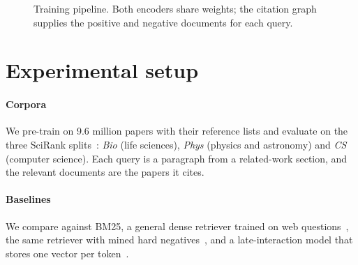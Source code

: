 \documentclass[10pt, twoside]{article}
\begin{document}
\begin{figure}[t]
  \centering
  \caption{Training pipeline. Both encoders share weights; the citation graph
  supplies the positive and negative documents for each query.}
  \label{fig:arch}
\end{figure}

\section{Experimental setup}
\label{sec:setup}

\paragraph{Corpora}
We pre-train on 9.6 million papers with their reference lists and evaluate on
the three SciRank splits~\cite{castellano2023scibench}: \emph{Bio} (life
sciences), \emph{Phys} (physics and astronomy) and \emph{CS} (computer
science). Each query is a paragraph from a related-work section, and the
relevant documents are the papers it cites.

\paragraph{Baselines}
We compare against BM25, a general dense retriever trained on web
questions~\cite{halvorsen2021dual}, the same retriever with mined hard
negatives~\cite{oyelaran2022hardneg}, and a late-interaction model that stores
one vector per token~\cite{sorensen2022lateinter}.
\end{document}
